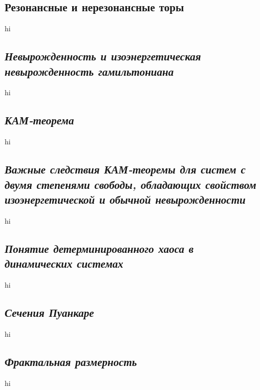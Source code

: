 \documentclass[a4paper]{article}
\begin{document}
\subsection{Резонансные и нерезонансные торы}
hi
\subsection{\emph{Невырожденность и изоэнергетическая невырожденность
гамильтониана}}
hi
\subsection{\emph{КАМ-теорема}}
hi
\subsection{\emph{Важные следствия КАМ-теоремы для систем с двумя степенями свободы,
обладающих свойством изоэнергетической и обычной невырожденности}}
hi
\subsection{\emph{Понятие детерминированного хаоса в динамических системах}}
hi
\subsection{\emph{Сечения Пуанкаре}}
hi
\subsection{\emph{Фрактальная размерность}}
hi
\end{document}
